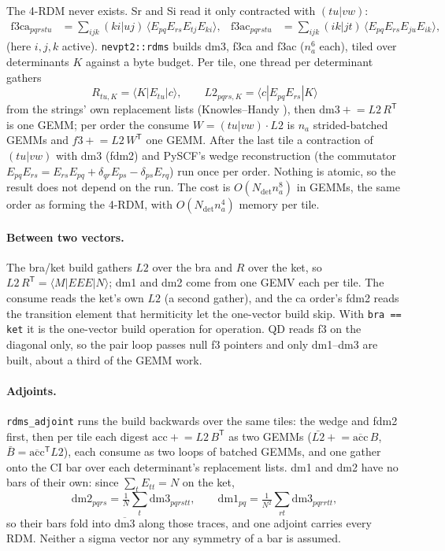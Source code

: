 \documentclass[11pt]{article}
\newcommand{\code}[1]{\texttt{#1}}
\newcommand{\T}{\mathsf T}
\begin{document}
The 4-RDM never exists. Sr and Si read it only contracted with $(tu|vw)$:
\begin{align}
  \mathrm{f3ca}_{pqrstu} &= \sum_{ijk}(ki|uj)\,\langle E_{pq}E_{rs}E_{tj}E_{ki}\rangle, &
  \mathrm{f3ac}_{pqrstu} &= \sum_{ijk}(ik|jt)\,\langle E_{pq}E_{rs}E_{ju}E_{ik}\rangle,
\end{align}
(here $i,j,k$ active). \code{nevpt2::rdms} builds dm3, f3ca and f3ac
($n_a^6$ each), tiled over determinants $K$ against a byte budget. Per tile,
one thread per determinant gathers
\begin{equation}
  R_{tu,K} = \langle K|E_{tu}|c\rangle,\qquad
  L2_{pqrs,K} = \langle c|E_{pq}E_{rs}|K\rangle
\end{equation}
from the strings' own replacement lists (Knowles--Handy \cite{knowles1984}),
then $\mathrm{dm3} \mathrel{+}= L2\,R^\T$ is one GEMM; per order the consume
$W = (tu|vw)\cdot L2$ is $n_a$ strided-batched GEMMs and $f3 \mathrel{+}= L2\,W^\T$
one GEMM. After the last tile a contraction of $(tu|vw)$ with dm3 (fdm2) and
PySCF's wedge reconstruction (the commutator $E_{pq}E_{rs} = E_{rs}E_{pq} +
\delta_{qr}E_{ps} - \delta_{ps}E_{rq}$) run once per order. Nothing is
atomic, so the result does not depend on the run. The cost is
$O(N_{\mathrm{det}}n_a^8)$ in GEMMs, the same order as forming the 4-RDM,
with $O(N_{\mathrm{det}}n_a^4)$ memory per tile.

\paragraph{Between two vectors.} The bra/ket build gathers $L2$ over the bra
and $R$ over the ket, so $L2\,R^\T = \langle M|EEE|N\rangle$; dm1 and dm2 come
from one GEMV each per tile. The consume reads the ket's own $L2$ (a second
gather), and the ca order's fdm2 reads the transition element that
hermiticity let the one-vector build skip. With \code{bra == ket} it is the
one-vector build operation for operation. QD reads f3 on the diagonal only,
so the pair loop passes null f3 pointers and only dm1--dm3 are built, about
a third of the GEMM work.

\paragraph{Adjoints.} \code{rdms\_adjoint} runs the build backwards over the
same tiles: the wedge and fdm2 first, then per tile each digest
$\mathrm{acc} \mathrel{+}= L2\,B^\T$ as two GEMMs ($\bar{L2} \mathrel{+}=
\overline{\mathrm{acc}}\,B$, $\bar B = \overline{\mathrm{acc}}^\T L2$), each
consume as two loops of batched GEMMs, and one gather onto the CI bar over
each determinant's replacement lists. dm1 and dm2 have no bars of their own:
since $\sum_t E_{tt} = N$ on the ket,
\begin{equation}
  \mathrm{dm2}_{pqrs} = \tfrac1N\sum_t \mathrm{dm3}_{pqrstt},\qquad
  \mathrm{dm1}_{pq} = \tfrac1{N^2}\sum_{rt}\mathrm{dm3}_{pqrrtt},
  \label{eq:traces}
\end{equation}
so their bars fold into $\overline{\mathrm{dm3}}$ along those traces, and
one adjoint carries every RDM. Neither a sigma vector nor any symmetry of a
bar is assumed.
\end{document}
